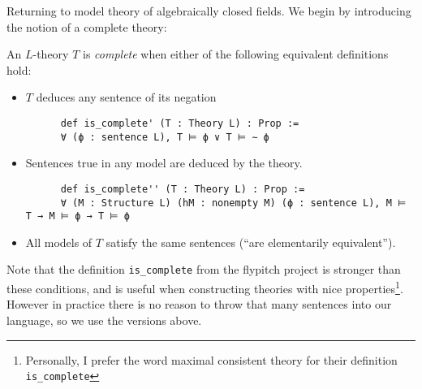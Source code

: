 Returning to model theory of algebraically closed fields.
We begin by introducing the notion of a complete theory:

\begin{dfn}
    An $L$-theory $T$ is \textit{complete}
    when either of the following equivalent definitions hold:
    \begin{itemize}
      \item  $T$ deduces any sentence of its negation
    \begin{lstlisting}
      def is_complete' (T : Theory L) : Prop :=
      ∀ (ϕ : sentence L), T ⊨ ϕ ∨ T ⊨ ∼ ϕ \end{lstlisting}
      \item Sentences true in any model are deduced by the theory.
    \begin{lstlisting}
      def is_complete'' (T : Theory L) : Prop :=
      ∀ (M : Structure L) (hM : nonempty M) (ϕ : sentence L), M ⊨ T → M ⊨ ϕ → T ⊨ ϕ \end{lstlisting}
      \item All models of $T$ satisfy the same sentences
            (``are elementarily equivalent'').
    \end{itemize}
    Note that the definition \texttt{is\_complete} from the flypitch project
    is stronger than these conditions, and is useful when constructing
    theories with nice properties\footnote{
      Personally, I prefer the word maximal consistent theory for
      their definition \texttt{is\_complete}}.
    However in practice there is no reason to throw that many sentences
    into our language, so we use the versions above.
\end{dfn}

